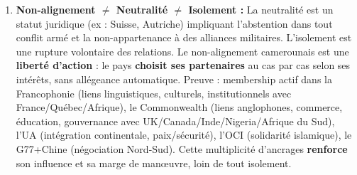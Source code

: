 \documentclass[11pt]{article}
\newcommand{\cle}[1]{{\popxbold\color{popdark}#1}}
\begin{document}
\begin{corrige}
\begin{enumerate}
\begin{enumerate}
    \end{enumerate}
    \item \textbf{Non-alignement $\neq$ Neutralité $\neq$ Isolement :}
    La \cle{neutralité} est un statut juridique (ex : Suisse, Autriche) impliquant l'abstention dans tout conflit armé et la non-appartenance à des alliances militaires. L'\cle{isolement} est une rupture volontaire des relations.
    Le \cle{non-alignement} camerounais est une \textbf{liberté d'action} : le pays \textbf{choisit ses partenaires} au cas par cas selon ses intérêts, sans allégeance automatique. Preuve : membership actif dans la \cle{Francophonie} (liens linguistiques, culturels, institutionnels avec France/Québec/Afrique), le \cle{Commonwealth} (liens anglophones, commerce, éducation, gouvernance avec UK/Canada/Inde/Nigeria/Afrique du Sud), l'\cle{UA} (intégration continentale, paix/sécurité), l'\cle{OCI} (solidarité islamique), le \cle{G77+Chine} (négociation Nord-Sud). Cette multiplicité d'ancrages \textbf{renforce} son influence et sa marge de manœuvre, loin de tout isolement.
\end{enumerate}
\end{corrige}
\end{document}
